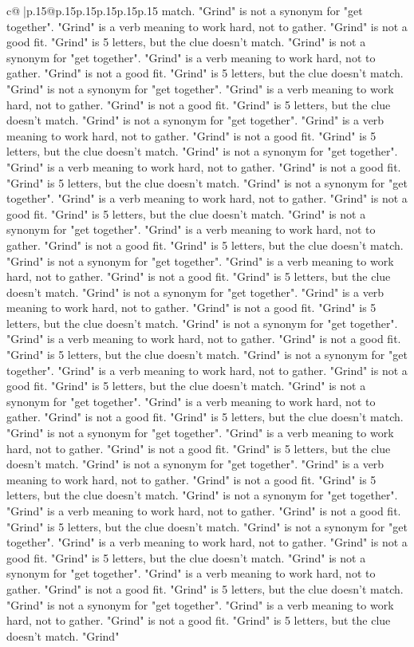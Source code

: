 \documentclass{article}
\begin{document}
{\begin{supertabular}{c@{$\;$}|p{.15\linewidth}@{}p{.15\linewidth}p{.15\linewidth}p{.15\linewidth}p{.15\linewidth}p{.15\linewidth}}
{{{match. "Grind" is not a synonym for "get together". "Grind" is a verb meaning to work hard, not to gather. "Grind" is not a good fit. "Grind" is 5 letters, but the clue doesn't match. "Grind" is not a synonym for "get together". "Grind" is a verb meaning to work hard, not to gather. "Grind" is not a good fit. "Grind" is 5 letters, but the clue doesn't match. "Grind" is not a synonym for "get together". "Grind" is a verb meaning to work hard, not to gather. "Grind" is not a good fit. "Grind" is 5 letters, but the clue doesn't match. "Grind" is not a synonym for "get together". "Grind" is a verb meaning to work hard, not to gather. "Grind" is not a good fit. "Grind" is 5 letters, but the clue doesn't match. "Grind" is not a synonym for "get together". "Grind" is a verb meaning to work hard, not to gather. "Grind" is not a good fit. "Grind" is 5 letters, but the clue doesn't match. "Grind" is not a synonym for "get together". "Grind" is a verb meaning to work hard, not to gather. "Grind" is not a good fit. "Grind" is 5 letters, but the clue doesn't match. "Grind" is not a synonym for "get together". "Grind" is a verb meaning to work hard, not to gather. "Grind" is not a good fit. "Grind" is 5 letters, but the clue doesn't match. "Grind" is not a synonym for "get together". "Grind" is a verb meaning to work hard, not to gather. "Grind" is not a good fit. "Grind" is 5 letters, but the clue doesn't match. "Grind" is not a synonym for "get together". "Grind" is a verb meaning to work hard, not to gather. "Grind" is not a good fit. "Grind" is 5 letters, but the clue doesn't match. "Grind" is not a synonym for "get together". "Grind" is a verb meaning to work hard, not to gather. "Grind" is not a good fit. "Grind" is 5 letters, but the clue doesn't match. "Grind" is not a synonym for "get together". "Grind" is a verb meaning to work hard, not to gather. "Grind" is not a good fit. "Grind" is 5 letters, but the clue doesn't match. "Grind" is not a synonym for "get together". "Grind" is a verb meaning to work hard, not to gather. "Grind" is not a good fit. "Grind" is 5 letters, but the clue doesn't match. "Grind" is not a synonym for "get together". "Grind" is a verb meaning to work hard, not to gather. "Grind" is not a good fit. "Grind" is 5 letters, but the clue doesn't match. "Grind" is not a synonym for "get together". "Grind" is a verb meaning to work hard, not to gather. "Grind" is not a good fit. "Grind" is 5 letters, but the clue doesn't match. "Grind" is not a synonym for "get together". "Grind" is a verb meaning to work hard, not to gather. "Grind" is not a good fit. "Grind" is 5 letters, but the clue doesn't match. "Grind" is not a synonym for "get together". "Grind" is a verb meaning to work hard, not to gather. "Grind" is not a good fit. "Grind" is 5 letters, but the clue doesn't match. "Grind" is not a synonym for "get together". "Grind" is a verb meaning to work hard, not to gather. "Grind" is not a good fit. "Grind" is 5 letters, but the clue doesn't match. "Grind" is not a synonym for "get together". "Grind" is a verb meaning to work hard, not to gather. "Grind" is not a good fit. "Grind" is 5 letters, but the clue doesn't match. "Grind" }}}
\end{supertabular}}
\end{document}
